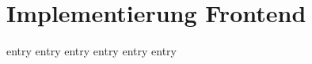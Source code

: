 \chapter{Implementierung Frontend}
\label{chap:implementierung_frontend}

{entry}
{entry}
{entry}
{entry}
{entry}
{entry}
